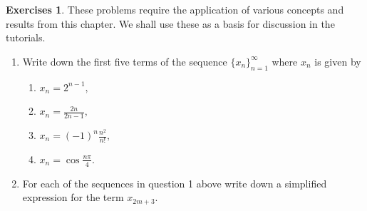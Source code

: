 \documentclass[extrafontsizes, twoside, a4paper]{memoir}
\theoremstyle{plain}%
\theoremstyle{definition}
\newtheorem{exer}{Exercises}[chapter]
\theoremstyle{remark}
\newcommand{\postitemskip}{\vskip 0.2in}
\begin{document}
\begin{exer}
These problems require the application of various concepts and results from this chapter. We shall use these as a basis for discussion in the tutorials.
\begin{enumerate}
\item
Write down the first five terms of the sequence $\{ x_n \}_{n=1}^\infty$ where $x_n$ is given by
\begin{enumerate}
\item
$x_n = 2^{n-1},$
\item
$x_n = \frac{2n}{2n-1},$
\item
$x_n = (-1)^n \frac{n^2}{n!},$
\item
$x_n = \cos{\frac{n\pi}{4}}.$
\end{enumerate}
\postitemskip
\item
For each of the sequences in question 1 above write down a simplified expression for the term $x_{2m+3}$.
\postitemskip


\end{enumerate}
\end{exer}
\end{document}

